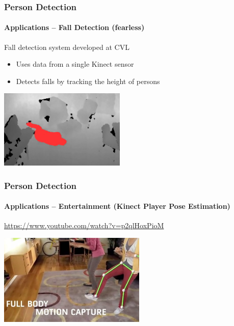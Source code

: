 \documentclass[xetex,professionalfont]{beamer}
\begin{document}

\begin{frame}
\frametitle{Person Detection}
\framesubtitle{Applications -- Fall Detection (fearless)}

Fall detection system developed at CVL
\begin{itemize}
	\item Uses data from a single Kinect sensor
    \item Detects falls by tracking the height of persons
\end{itemize}

\begin{center}
    \includegraphics[width=6cm]{figures/fearless-screenshot.jpg}
\end{center}

\end{frame}


\begin{frame}
\frametitle{Person Detection}
\framesubtitle{Applications -- Entertainment (Kinect Player Pose Estimation)}

\begin{center}
    \url{https://www.youtube.com/watch?v=p2qlHoxPioM}
\end{center}

\begin{center}
    \includegraphics[width=7cm]{figures/kinect-promo.jpg}
\end{center}

\end{frame}
\end{document}
